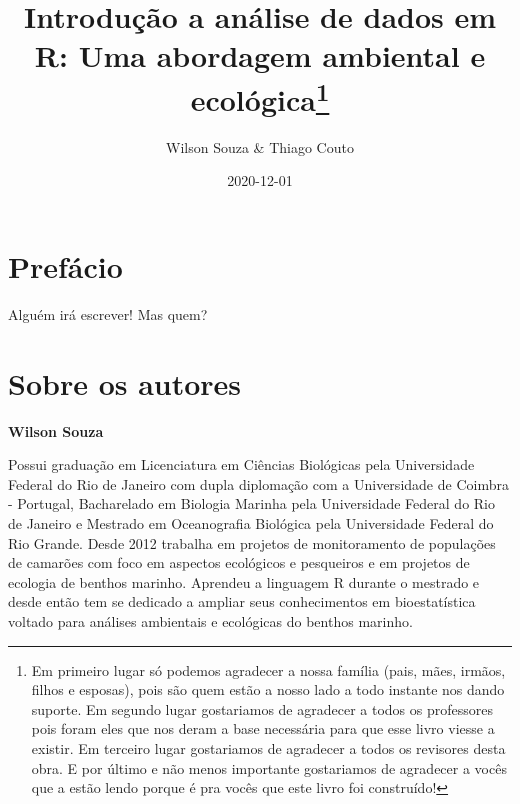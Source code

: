 \documentclass[titlepage, oneside, openany, a4paper]{book}
\title{Introdução a análise de dados em R: Uma abordagem ambiental e ecológica\thanks{Em primeiro lugar só podemos agradecer a nossa família (pais, mães, irmãos, filhos e esposas), pois são quem estão a nosso lado a todo instante nos dando suporte. Em segundo lugar gostariamos de agradecer a todos os professores pois foram eles que nos deram a base necessária para que esse livro viesse a existir. Em terceiro lugar gostariamos de agradecer a todos os revisores desta obra. E por último e não menos importante gostariamos de agradecer a vocês que a estão lendo porque é pra vocês que este livro foi construído!}}
\author{Wilson Souza \& Thiago Couto}
\date{2020-12-01}
\let\oldmaketitle\maketitle
\begin{document}
\maketitle


\begin{figure}
  
\end{figure}

\let\maketitle\oldmaketitle
\maketitle

\renewcommand*\contentsname{Índice}
{
\hypersetup{linkcolor=}
\setcounter{tocdepth}{1}
\tableofcontents
}
\listoftables
\listoffigures
\hypertarget{prefuxe1cio}{%
\chapter*{Prefácio}\label{prefuxe1cio}}

Alguém irá escrever! Mas quem?

\hypertarget{sobre-os-autores}{%
\chapter*{Sobre os autores}\label{sobre-os-autores}}

\textbf{Wilson Souza}

Possui graduação em Licenciatura em Ciências Biológicas pela Universidade Federal do Rio de Janeiro com dupla diplomação com a Universidade de Coimbra - Portugal, Bacharelado em Biologia Marinha pela Universidade Federal do Rio de Janeiro e Mestrado em Oceanografia Biológica pela Universidade Federal do Rio Grande. Desde 2012 trabalha em projetos de monitoramento de populações de camarões com foco em aspectos ecológicos e pesqueiros e em projetos de ecologia de benthos marinho. Aprendeu a linguagem R durante o mestrado e desde então tem se dedicado a ampliar seus conhecimentos em bioestatística voltado para análises ambientais e ecológicas do benthos marinho.
\end{document}
